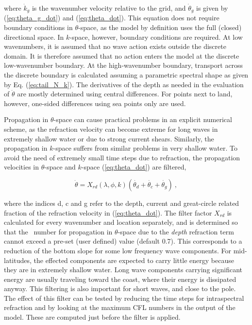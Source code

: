 \noindent
where $\dot{k}_g$ is the wavenumber velocity relative to the grid, and
$\dot{\theta}_g$ is given by (\ref{eq:theta_g_dot}) and (\ref{eq:theta_dot}).
This equation does not require boundary conditions in $\theta$-space, as the
model by definition uses the full (closed) directional space. In $k$-space,
however, boundary conditions are required. At low wavenumbers, it is assumed
that no wave action exists outside the discrete domain. It is therefore
assumed that no action enters the model at the discrete low-wavenumber
boundary. At the high-wavenumber boundary, transport across the discrete
boundary is calculated assuming a parametric spectral shape as given by
Eq. (\ref{eq:tail_N_k}). The derivatives of the depth as needed in the
evaluation of $\dot{\theta}$ are mostly determined using central
differences. For points next to land, however, one-sided differences using sea
points only are used.

Propagation in $\theta$-space can cause practical problems in an explicit
numerical scheme, as the refraction velocity can become extreme for long waves
in extremely shallow water or due to strong current shears. Similarly, 
the propagation in $k$-space suffers from similar problems in very shallow water. 
To avoid the need of extremely small time steps
due to refraction, the propagation velocities in $\theta$-space and $k$-space
(\ref{eq:theta_dot}) are filtered,


\begin{equation}
\dot{\theta} = X_{rd}(\lambda,\phi,k)\left( \dot{\theta_d} + 
\dot{\theta_c} + \dot{\theta_g} \right)\: , \label{eq:theta_filter} \end{equation}

\noindent
where the indices d, c and g refer to the depth, current and great-circle related fraction of
the refraction velocity in (\ref{eq:theta_dot}). The filter factor $X_{rd}$ is
calculated for every wavenumber and location separately, and is determined so
that the \cfl\ number for propagation in $\theta$-space due to the {\em depth}
refraction term cannot exceed a pre-set (user defined) value (default
0.7). This corresponds to a reduction of the bottom slope for some low
frequency wave components. For mid-latitudes, the effected components are expected to carry
little energy because they are in extremely shallow water. Long wave
components carrying significant energy are usually traveling toward the coast,
where their energy is dissipated anyway. This filtering is also important for short waves, 
and close to the pole. The effect of this filter can be tested by reducing the time steps for
intraspectral refraction and by looking at the maximum CFL numbers in the output of the model. 
These are computed just before the filter is applied. 

